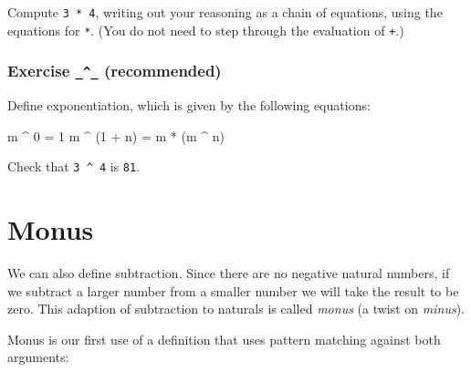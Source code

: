 Compute \texttt{3\ *\ 4}, writing out your reasoning as a chain of
equations, using the equations for \texttt{*}. (You do not need to step
through the evaluation of \texttt{+}.)

\begin{fence}
\begin{code}%
\>[0]\<%
\end{code}
\end{fence}

\hypertarget{Naturals-power}{%
\subsubsection{\texorpdfstring{Exercise \texttt{\_\^{}\_}
(recommended)}{Exercise \_\^{}\_ (recommended)}}\label{Naturals-power}}

Define exponentiation, which is given by the following equations:

\begin{myDisplay}
m ^ 0        =  1
m ^ (1 + n)  =  m * (m ^ n)
\end{myDisplay}

Check that \texttt{3\ \^{}\ 4} is \texttt{81}.

\begin{fence}
\begin{code}%
\>[0]\<%
\end{code}
\end{fence}

\hypertarget{monus}{%
\section{Monus}\label{monus}}

We can also define subtraction. Since there are no negative natural
numbers, if we subtract a larger number from a smaller number we will
take the result to be zero. This adaption of subtraction to naturals is
called \emph{monus} (a twist on \emph{minus}).

Monus is our first use of a definition that uses pattern matching
against both arguments:

